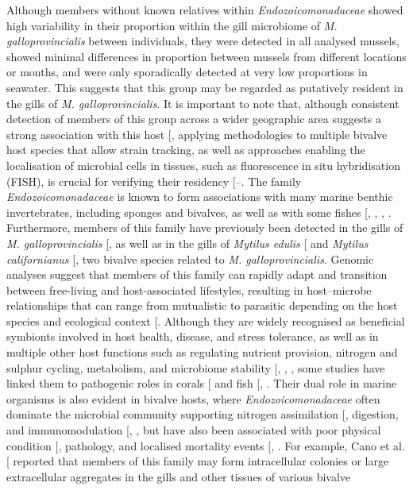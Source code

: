 \documentclass[
  12 pt,
]{article}
\begin{document}
Although members without known relatives within \emph{Endozoicomonadaceae} showed high variability in their proportion within the gill microbiome of \emph{M. galloprovincialis} between individuals, they were detected in all analysed mussels, showed minimal differences in proportion between mussels from different locations or months, and were only sporadically detected at very low proportions in seawater. This suggests that this group may be regarded as putatively resident in the gills of \emph{M. galloprovincialis}. It is important to note that, although consistent detection of members of this group across a wider geographic area suggests a strong association with this host {[}\citeproc{ref-Unzueta-Martinez2022a}{8}{]}, applying methodologies to multiple bivalve host species that allow strain tracking, as well as approaches enabling the localisation of microbial cells in tissues, such as fluorescence in situ hybridisation (FISH), is crucial for verifying their residency {[}--\citeproc{ref-Neave2016}{108}{]}. The family \emph{Endozoicomonadaceae} is known to form associations with many marine benthic invertebrates, including sponges and bivalves, as well as with some fishes {[}, , , \citeproc{ref-Schill2017}{110}{]}. Furthermore, members of this family have previously been detected in the gills of \emph{M. galloprovincialis} {[}\citeproc{ref-Cano2020}{111}{]}, as well as in the gills of \emph{Mytilus edulis} {[}\citeproc{ref-Schill2017}{110}{]} and \emph{Mytilus californianus} {[}\citeproc{ref-Neu2021}{112}{]}, two bivalve species related to \emph{M. galloprovincialis}. Genomic analyses suggest that members of this family can rapidly adapt and transition between free-living and host-associated lifestyles, resulting in host--microbe relationships that can range from mutualistic to parasitic depending on the host species and ecological context {[}\citeproc{ref-daSilva2025}{106}{]}. Although they are widely recognised as beneficial symbionts involved in host health, disease, and stress tolerance, as well as in multiple other host functions such as regulating nutrient provision, nitrogen and sulphur cycling, metabolism, and microbiome stability {[}, , \citeproc{ref-El-Khaled2026}{113}{]}, some studies have linked them to pathogenic roles in corals {[}\citeproc{ref-Pogoreutz2024}{114}{]} and fish {[}, \citeproc{ref-Qi2018}{116}{]}. Their dual role in marine organisms is also evident in bivalve hosts, where \emph{Endozoicomonadaceae} often dominate the microbial community supporting nitrogen assimilation {[}\citeproc{ref-Rossbach2019}{117}{]}, digestion, and immunomodulation {[}, \citeproc{ref-Jensen2021}{118}{]}, but have also been associated with poor physical condition {[}\citeproc{ref-Bennion2021}{119}{]}, pathology, and localised mortality events {[}, \citeproc{ref-Howells2021}{120}{]}. For example, Cano et al. {[}\citeproc{ref-Cano2020}{111}{]} reported that members of this family may form intracellular colonies or large extracellular aggregates in the gills and other tissues of various bivalve 
\end{document}
